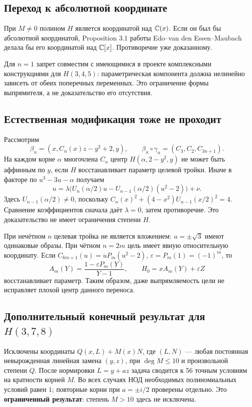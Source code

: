 \subsection*{Переход к абсолютной координате}
При $M\ne0$ полином $H$ является координатой над ${\mathbb{C}}(x)$. Если он был бы абсолютной координатой, Proposition 3.1 работы Edo--van den Essen--Maubach \cite{EVM} делала бы его координатой над ${\mathbb{C}}[x]$. Противоречие уже доказанному.

Для $n=1$ запрет совместим с имеющимися в проекте комплексными конструкциями для $H(3,4,5)$: параметрическая компонента должна нелинейно зависеть от обеих поперечных переменных. Это ограничение формы выпрямителя, а не доказательство его отсутствия.

\subsection*{Естественная модификация тоже не проходит}
Рассмотрим
\[
\beta_n=(x,C_n(x)z-y^2+2,y),\qquad
\beta_n\circ\gamma_n=(C_3,C_2,C_{3n+1}).
\]
На каждом корне $\alpha$ многочлена $C_n$ центр $H(\alpha,2-y^2,y)$ не может быть аффинным по $y$, если $H$ восстанавливает параметр целевой тройки. Иначе в факторе по $u^3-3u-\alpha$ получаем
\[
u=\lambda\bigl(U_n(\alpha/2)u-U_{n-1}(\alpha/2)(u^2-2)\bigr)+\nu.
\]
Здесь $U_{n-1}(\alpha/2)\ne0$, поскольку
$C_n(x)^2+(4-x^2)U_{n-1}(x/2)^2=4$. Сравнение коэффициентов сначала даёт $\lambda=0$, затем противоречие. Это доказательство не имеет ограничения степени $H$.

При нечётном $n$ целевая тройка не является вложением: $u=\pm\sqrt3$ имеют одинаковые образы. При чётном $n=2m$ цель имеет явную относительную координату. Если
$C_{6m+1}(u)=uP_m(u^2-2)$, $\varepsilon=P_m(1)=(-1)^m$, то
\[
A_m(Y)=\frac{1-\varepsilon P_m(Y)}{Y-1},\qquad
H_0=xA_m(Y)+\varepsilon Z
\]
восстанавливает параметр. Таким образом, даже выпрямляемость цели не исправляет плохой центр данного переноса.

\subsection*{Дополнительный конечный результат для $H(3,7,8)$}
Исключены координаты $Q(x,L)+M(x)N$, где $(L,N)$ --- любая постоянная невырожденная линейная замена $(y,z)$, при $\deg M\le10$ и произвольной степени $Q$. После нормировки $L=y+az$ задача сводится к 56 точным условиям на кратности корней $M$. Во всех случаях НОД необходимых полиномиальных условий равен $1$; повторные корни при $a=\pm i/2$ проверены отдельно. Это \textbf{ограниченный результат}: степень $M>10$ здесь не исключена.

